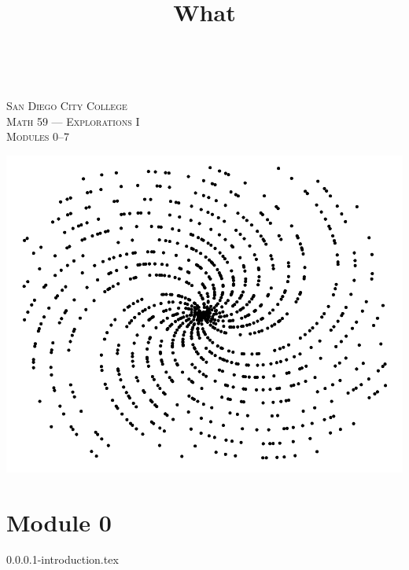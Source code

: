 \documentclass{book}
\title{What}
\begin{document}
\frontmatter
\pagestyle{plain}



\begin{titlepage}
  \

  \vfill
  
  \begin{center}
    \Large\textsc{San Diego City College\\ Math 59 --- Explorations I\\ Modules 0--7}
  \end{center}

  \vfill
 
  \begin{center}
    \includegraphics{primespiral.pdf}
  \end{center}

  \vfill
  
\end{titlepage}

\setcounter{tocdepth}{0}
\setcounter{secnumdepth}{-2}
\tableofcontents

\mainmatter
\pagestyle{fancy}

\part{Module 0}


\graphicspath{{module0/0.0.0.1-introduction/}}
{0.0.0.1-introduction.tex}
\end{document}
